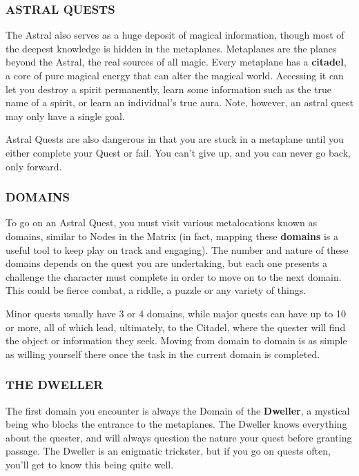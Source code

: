 \documentclass[oneside,10pt]{article}
\begin{document}
\begin{multicols}{2}
\subsubsection{ASTRAL QUESTS}
The Astral also serves as a huge deposit of magical information,
though most of the deepest knowledge is hidden in the
metaplanes. Metaplanes are the planes beyond the Astral, the real
sources of all magic. Every metaplane has a \textbf{citadel}, a core
of pure magical energy that can alter the magical world.  Accessing it
can let you destroy a spirit permanently, learn some information such
as the true name of a spirit, or learn an individual’s true
aura. Note, however, an astral quest may only have a single goal.

Astral Quests are also dangerous in that you are stuck in a
metaplane until you either complete your Quest or fail. You
can’t give up, and you can never go back, only forward.

\subsubsection{DOMAINS}
To go on an Astral Quest, you must visit various metalocations known
as domains, similar to Nodes in the Matrix (in fact, mapping these
\textbf{domains} is a useful tool to keep play on track and
engaging). The number and nature of these domains depends on the quest
you are undertaking, but each one presents a challenge the character
must complete in order to move on to the next domain. This could be
fierce combat, a riddle, a puzzle or any variety of things.

Minor quests usually have 3 or 4 domains, while major quests can have
up to 10 or more, all of which lead, ultimately, to the Citadel, where
the quester will find the object or information they seek. Moving from
domain to domain is as simple as willing yourself there once the task
in the current domain is completed.

\subsubsection{THE DWELLER}
The first domain you encounter is always the Domain of the
\textbf{Dweller}, a mystical being who blocks the entrance to the
metaplanes. The Dweller knows everything about the quester, and will
always question the nature your quest before granting passage. The
Dweller is an enigmatic trickster, but if you go on quests often,
you’ll get to know this being quite well.

\end{multicols}
\end{document}
